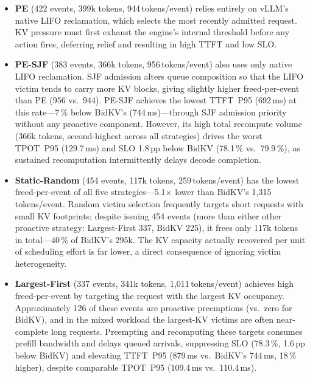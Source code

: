 \documentclass[sigconf,nonacm]{acmart}
\newcommand{\bidkv}{BidKV\xspace}
\begin{document}
\begin{itemize}[leftmargin=*,nosep]
\item \textbf{PE} (422 events, 399k tokens, 944\,tokens/event) relies entirely
  on vLLM's native LIFO reclamation, which selects the most recently admitted
  request.  KV pressure must first exhaust the engine's internal threshold
  before any action fires, deferring relief and resulting in high TTFT and
  low SLO.

\item \textbf{PE-SJF} (383 events, 366k tokens, 956\,tokens/event) also
  uses only native LIFO reclamation.  SJF admission alters queue composition so
  that the LIFO victim tends to carry more KV blocks, giving slightly higher
  freed-per-event than PE (956 vs.~944).  PE-SJF achieves the lowest
  TTFT~P95 (692\,ms) at this rate---7\,\% below \bidkv's (744\,ms)---through
  SJF admission priority without any proactive component.  However, its high
  total recompute volume (366k tokens, second-highest across all strategies)
  drives the worst TPOT~P95 (129.7\,ms) and SLO 1.8\,pp below \bidkv
  (78.1\,\% vs.~79.9\,\%), as sustained recomputation intermittently
  delays decode completion.

\item \textbf{Static-Random} (454 events, 117k tokens, 259\,tokens/event) has
  the lowest freed-per-event of all five strategies---5.1$\times$ lower than
  \bidkv's 1{,}315\,tokens/event.  Random victim selection frequently targets
  short requests with small KV footprints; despite issuing 454 events
  (more than either other proactive strategy: Largest-First 337, \bidkv 225),
  it frees only 117k tokens in total---40\,\% of \bidkv's 295k.  The KV capacity actually recovered
  per unit of scheduling effort is far lower, a direct consequence of
  ignoring victim heterogeneity.

\item \textbf{Largest-First} (337 events, 341k tokens, 1{,}011\,tokens/event)
  achieves high freed-per-event by targeting the request with the largest KV
  occupancy.  Approximately 126 of these events are proactive preemptions
  (vs.~zero for \bidkv), and in the mixed workload the largest-KV victims are
  often near-complete long requests.  Preempting and recomputing these targets
  consumes prefill bandwidth and delays queued arrivals, suppressing SLO
  (78.3\,\%, 1.6\,pp below \bidkv) and elevating TTFT~P95
  (879\,ms vs.~\bidkv's 744\,ms, 18\,\% higher), despite comparable
  TPOT~P95 (109.4\,ms vs.~110.4\,ms).


\end{itemize}
\end{document}
